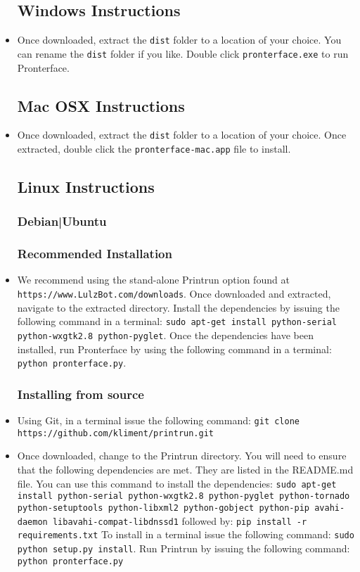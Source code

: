 \begin{itemize}
\subsection{Windows Instructions}
\item Once downloaded, extract the \texttt{dist} folder to a location of your choice. You can rename the \texttt{dist} folder if you like. Double click \texttt{pronterface.exe} to run Pronterface.


\subsection{Mac OSX Instructions}
\item Once downloaded, extract the \texttt{dist} folder to a location of your choice. Once extracted, double click the \texttt{pronterface-mac.app} file to install.

\subsection{Linux Instructions}
\subsubsection{Debian|Ubuntu}
\subsubsection{Recommended Installation}
\item We recommend using the stand-alone Printrun option found at \texttt{https://www.LulzBot.com/downloads}. Once downloaded and extracted, navigate to the extracted directory. Install the dependencies by issuing the following command in a terminal: \texttt{sudo apt-get install python-serial python-wxgtk2.8 python-pyglet}. Once the dependencies have been installed, run Pronterface by using the following command in a terminal: \texttt{python pronterface.py}.

\subsubsection{Installing from source}
\item Using Git, in a terminal issue the following command: \texttt{git clone https://github.com/kliment/printrun.git}
\item Once downloaded, change to the Printrun directory. You will need to ensure that the following dependencies are met. They are listed in the README.md file. You can use this command to install the dependencies: 
\texttt{sudo apt-get install python-serial python-wxgtk2.8 python-pyglet python-tornado python-setuptools python-libxml2 python-gobject python-pip avahi-daemon libavahi-compat-libdnssd1}
followed by:
\texttt{pip install -r requirements.txt}
To install in a terminal issue the following command:
\texttt{sudo python setup.py install}.
Run Printrun by issuing the following command:
\texttt{python pronterface.py}


\end{itemize}
